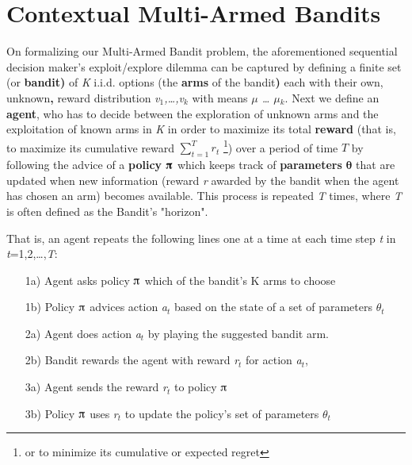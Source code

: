 \documentclass[nojss]{jss}\usepackage[]{graphicx}\usepackage[]{color}
\begin{document}
\section{Contextual Multi-Armed Bandits}

On formalizing our Multi-Armed Bandit problem, the aforementioned sequential decision maker's exploit/explore dilemma can be captured by defining a finite set (or \textbf{bandit)} of \textit{K} i.i.d. options (the \textbf{arms }of the bandit\textbf{) }each with their own, unknown\textbf{, }reward distribution \textit{v${}_{1}$,{\dots},v${}_{k}$} with means \textit{$\mu$ {\dots} $\mu$${}_{k}$}. Next we define an \textbf{agent}, who has to decide between the exploration of unknown arms and the exploitation of known arms in \textit{K} in order to maximize its total\textbf{ reward} (that is, to maximize its cumulative reward $\sum_{t=1}^T r_t$ \footnote{or to minimize its cumulative or expected regret}) over a period of time $T$ by following the advice of a \textbf{policy $\boldsymbol{\piup}$} which keeps track of \textbf{parameters} \textbf{\textit{$\boldsymbol{\theta}$}}\textit{ }that are updated when new information (reward \textit{r} awarded by the bandit when the agent has chosen an arm) becomes available. This process is repeated \textit{T} times, where \textit{T} is often defined as the Bandit's "horizon".

That is, an agent repeats the following lines one at a time at each time step \textit{t }in \textit{t}=1,2,{\dots},\textit{T}:

\begin{enumerate}
         \item[1a)] Agent asks policy $\piup$ which of the bandit's K arms to choose
         \item[1b)] Policy $\piup$ advices action \textit{a${}_{t}$} based on the state of a set of parameters \textit{$\theta$${}_{t}$}
         \item[2a)] Agent does action \textit{a${}_{t}$} by playing the suggested bandit arm.
         \item[2b)] Bandit rewards the agent with reward \textit{r${}_{t}$ }for action \textit{a${}_{t}$},
         \item[3a)] Agent sends the reward\textit{ r${}_{t}$ }to policy $\piup$
         \item[3b)] Policy $\piup$ uses \textit{r${}_{t}$} to update the policy's set of parameters\textit{ $\theta$${}_{t}$}
\end{enumerate}
\end{document}
